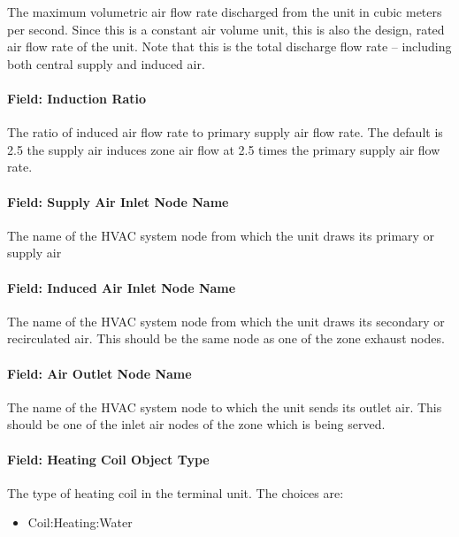The maximum volumetric air flow rate discharged from the unit in cubic meters per second. Since this is a constant air volume unit, this is also the design, rated air flow rate of the unit. Note that this is the total discharge flow rate -- including both central supply and induced air.

\paragraph{Field: Induction Ratio}\label{field-induction-ratio}

The ratio of induced air flow rate to primary supply air flow rate. The default is 2.5 the supply air induces zone air flow at 2.5 times the primary supply air flow rate.

\paragraph{Field: Supply Air Inlet Node Name}\label{field-supply-air-inlet-node-name-2}

The name of the HVAC system node from which the unit draws its primary or supply air

\paragraph{Field: Induced Air Inlet Node Name}\label{field-induced-air-inlet-node-name}

The name of the HVAC system node from which the unit draws its secondary or recirculated air. This should be the same node as one of the zone exhaust nodes.

\paragraph{Field: Air Outlet Node Name}\label{field-air-outlet-node-name-6}

The name of the HVAC system node to which the unit sends its outlet air. This should be one of the inlet air nodes of the zone which is being served.

\paragraph{Field: Heating Coil Object Type}\label{field-heating-coil-object-type-1}

The type of heating coil in the terminal unit. The choices are:

\begin{itemize}
\tightlist
\item
  Coil:Heating:Water
\end{itemize}

